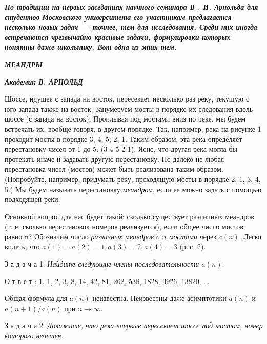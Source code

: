 \documentclass[Main.tex]{subfiles}
\begin{document}
\begin{multicols}{2}
\begin{flushleft}
\textbf{\textit{\small{По традиции на первых заседаниях научного семинара В . И. Арнольда для студентов Московского университета его участникам предлагается несколько новых задач — точнее, тем для исследования. Среди них иногда встречаются чрезвычайно красивые задачи, формулировки которых понятны даже школьнику. Вот одна из этих тем.}}}
\end{flushleft}

\begin{flushleft}
\huge{\textbf{\textit{МЕАНДРЫ}}} \par
\end{flushleft}

\begin{flushleft}{\small{\textbf{\textit{Академик В. АРНОЛЬД}}}}\end{flushleft}

\noindent Шоссе, идущее с запада на восток, пересекает несколько раз реку, текущую с юго-запада также на восток.
Занумеруем мосты в порядке их следования вдоль шоссе (с запада на восток). Проплывая под мостами вниз по реке, мы будем встречать их, вообще говоря, в другом порядке. Так, например, река на рисунке 1 проходит мосты в порядке 3, 4, 5, 2, 1. Таким образом, эта река определяет перестановку чисел от 1 до 5: (3 4 5 2 1). Ясно, что другая река могла бы протекать иначе и задавать другую перестановку. Но далеко не любая перестановка чисел (мостов) может быть реализована таким образом. (Попробуйте, например, придумать реку, проходящую мосты в порядке 2, 1, 3, 4, 5.) Мы будем называть перестановку \textit{меандром}, если ее можно задать с помощью подходящей реки.

Основной вопрос для нас будет такой: сколько существует различных меандров (т. е. сколько перестановок номеров реализуется), если общее число мостов равно n? Обозначим число \textit{различных меандров с $n$ мостами} через $a(n)$. Легко видеть, что $a(1) = a(2) = 1, a(3) = 2, a(4) = 3$ (рис. 2).

З а д а ч а 1. \textit{Найдите следующие члены последовательности $a(n)$}.

О т в е т : 1, 1, 2, 3, 8, 14, 42, 81, 262, 538, 1828, 3926, 13820, ...

Общая формула для $a(n)$ неизвестна. Неизвестны даже асимптотики $a(n)$ и $a(n + 1)/a(n)$ при $n \rightarrow \infty$.

З а д а ч а 2. \textit{Докажите, что река впервые пересекает шоссе под мостом, номер которого нечетен.}


\end{multicols}
\end{document}
